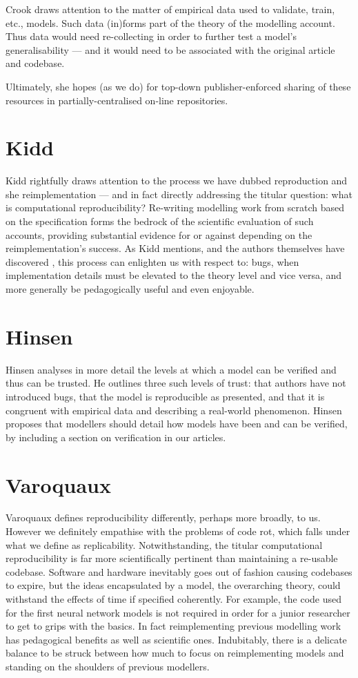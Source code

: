 \documentclass[jou]{apa6}
\begin{document}
Crook draws attention to the matter of empirical data used to validate, train, etc., models. Such data (in)forms part of the theory of the modelling account. Thus data would need re-collecting in order to further test a model's generalisability --- and it would need to be associated with the original article and codebase. 

Ultimately, she hopes (as we do) for top-down publisher-enforced sharing of these resources in partially-centralised on-line repositories.

\section{Kidd}
Kidd rightfully draws attention to the process we have dubbed reproduction and she reimplementation --- and in fact directly addressing the titular question: what is computational reproducibility? Re-writing modelling work from scratch based on the specification forms the bedrock of the scientific evaluation of such accounts, providing substantial evidence for or against depending on the reimplementation's success. As Kidd mentions, and the authors themselves have discovered \cite{cooper14}, this process can enlighten us with respect to: bugs, when implementation details must be elevated to the theory level and vice versa, and more generally be pedagogically useful and even enjoyable.

\section{Hinsen}
Hinsen analyses in more detail the levels at which a model can be verified and thus can be trusted. He outlines three such levels of trust: that authors have not introduced bugs, that the model is reproducible as presented, and that it is congruent with empirical data and describing a real-world phenomenon. Hinsen proposes that modellers should detail how models have been and can be verified, by including a section on verification in our articles.

\section{Varoquaux}
Varoquaux defines reproducibility differently, perhaps more broadly, to us. However we definitely empathise with the problems of code rot, which falls under what we define as replicability. Notwithstanding, the titular computational reproducibility is far more scientifically pertinent than maintaining a re-usable codebase. Software and hardware inevitably goes out of fashion causing codebases to expire, but the ideas encapsulated by a model, the overarching theory, could withstand the effects of time if specified coherently. For example, the code used for the first neural network models is not required in order for a junior researcher to get to grips with the basics. In fact reimplementing previous modelling work has pedagogical benefits as well as scientific ones. Indubitably, there is a delicate balance to be struck between how much to focus on reimplementing models and standing on the shoulders of previous modellers. 
\end{document}
